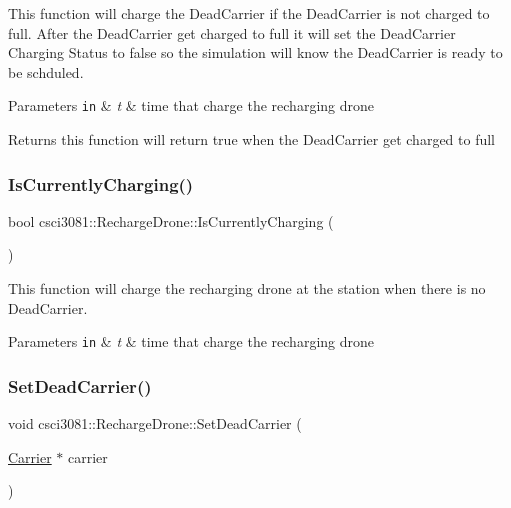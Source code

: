 This function will charge the Dead\+Carrier if the Dead\+Carrier is not charged to full. After the Dead\+Carrier get charged to full it will set the Dead\+Carrier Charging Status to false so the simulation will know the Dead\+Carrier is ready to be schduled. 


\begin{DoxyParams}[1]{Parameters}
\mbox{\tt in}  & {\em t} & time that charge the recharging drone \\
\hline
\end{DoxyParams}
\begin{DoxyReturn}{Returns}
this function will return true when the Dead\+Carrier get charged to full 
\end{DoxyReturn}
\mbox{\label{classcsci3081_1_1RechargeDrone_a21f38d9534ed51a82006df0a4d7ab78e}} 
\subsubsection{\texorpdfstring{Is\+Currently\+Charging()}{IsCurrentlyCharging()}}
{\footnotesize\ttfamily bool csci3081\+::\+Recharge\+Drone\+::\+Is\+Currently\+Charging (\begin{DoxyParamCaption}{ }\end{DoxyParamCaption})}



This function will charge the recharging drone at the station when there is no Dead\+Carrier. 


\begin{DoxyParams}[1]{Parameters}
\mbox{\tt in}  & {\em t} & time that charge the recharging drone \\
\hline
\end{DoxyParams}
\mbox{\label{classcsci3081_1_1RechargeDrone_ab1acfe860678cd982e0d65be34d4e1d7}} 
\subsubsection{\texorpdfstring{Set\+Dead\+Carrier()}{SetDeadCarrier()}}
{\footnotesize\ttfamily void csci3081\+::\+Recharge\+Drone\+::\+Set\+Dead\+Carrier (\begin{DoxyParamCaption}\item[{\hyperlink{classcsci3081_1_1Carrier}{Carrier} $\ast$}]{carrier }\end{DoxyParamCaption})}



